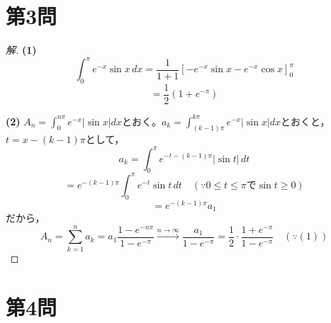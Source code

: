 \documentclass[../main.tex]{subfiles}
\begin{document}
\newpage

\section*{第3問}

\begin{proof}[解]
  \textbf{(1)}
  \[
    \int_0^\pi e^{-x}\sin x\,dx=\frac{1}{1+1}\left[-e^{-x}\sin x-e^{-x}\cos x\right]_0^\pi
  \]
  \[
    =\frac12\left(1+e^{-\pi}\right)
  \]

  \textbf{(2)} $A_n=\displaystyle\int_0^{n\pi}e^{-x}|\sin x|dx$とおく。$a_k=\displaystyle\int_{(k-1)\pi}^{k\pi}e^{-x}|\sin x|dx$とおくと，$t=x-(k-1)\pi$として，
  \[
    a_k=\int_0^\pi e^{-t-(k-1)\pi}|\sin t|\,dt
  \]
  \[
    =e^{-(k-1)\pi}\int_0^\pi e^{-t}\sin t\,dt \quad(\because0\le t\le\pi\text{で}\sin t\ge0)
  \]
  \[
    =e^{-(k-1)\pi}a_1
  \]
  だから，
  \[
    A_n=\sum_{k=1}^na_k=a_1\frac{1-e^{-n\pi}}{1-e^{-\pi}}\xrightarrow{n\to\infty}\frac{a_1}{1-e^{-\pi}}=\frac12\cdot\frac{1+e^{-\pi}}{1-e^{-\pi}} \quad(\because(1))
  \]
\end{proof}

\newpage

\section*{第4問}
\end{document}
